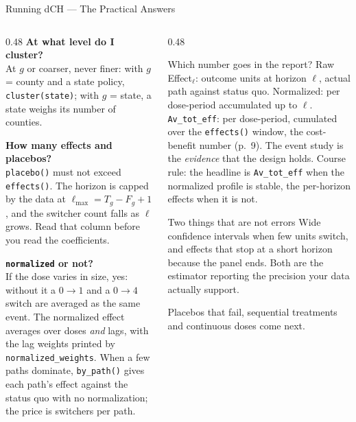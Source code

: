 \documentclass[main.tex]{subfiles}
\begin{document}
\begin{frame}{Running dCH --- The Practical Answers}

  \begin{columns}[T]
    \begin{column}{0.48\textwidth}
      \textbf{At what level do I cluster?}\\
      \footnotesize At $g$ or coarser, never finer: with $g$ = county and a
      state policy, \texttt{cluster(state)}; with $g$ = state, a state weighs
      its number of counties.

      \medskip
      \normalsize\textbf{How many effects and placebos?}\\
      \footnotesize \texttt{placebo()} must not exceed \texttt{effects()}. The
      horizon is capped by the data at $\ell_{\max} = T_g - F_g + 1$, and the
      switcher count falls as $\ell$ grows. Read that column before you read the
      coefficients.

      \medskip
      \normalsize\textbf{\texttt{normalized} or not?}\\
      \footnotesize If the dose varies in size, yes: without it a
      $0\!\to\!1$ and a $0\!\to\!4$ switch are averaged as the same event. The
      normalized effect averages over doses \emph{and} lags, with the lag
      weights printed by \texttt{normalized\_weights}. When a few paths
      dominate, \texttt{by\_path()} gives each path's effect against the status
      quo with no normalization; the price is switchers per path.
    \end{column}
    \begin{column}{0.48\textwidth}
      \begin{block}{\footnotesize Which number goes in the report?}
        \footnotesize
        Raw Effect$_\ell$: outcome units at horizon $\ell$, actual path against
        status quo. Normalized: per dose-period accumulated up to $\ell$.
        \texttt{Av\_tot\_eff}: per dose-period, cumulated over the
        \texttt{effects()} window, the cost-benefit number (p.~9). The event
        study is the \emph{evidence} that the design holds. Course rule: the
        headline is \texttt{Av\_tot\_eff} when the normalized profile is
        stable, the per-horizon effects when it is not.
      \end{block}

      \smallskip
      \begin{alertblock}{\footnotesize Two things that are not errors}
        \footnotesize
        Wide confidence intervals when few units switch, and effects that stop
        at a short horizon because the panel ends. Both are the estimator
        reporting the precision your data actually support.
      \end{alertblock}

      \smallskip
      \footnotesize Placebos that fail, sequential treatments and continuous
      doses come next.
    \end{column}
  \end{columns}

\end{frame}
\end{document}
